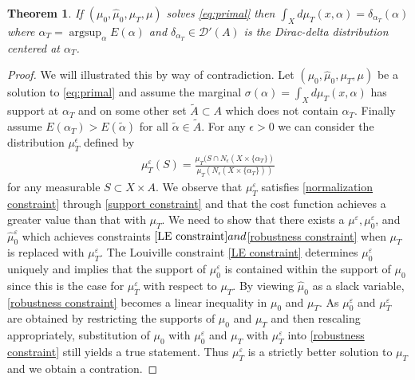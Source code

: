 \documentclass[12pt]{amsart}
\newtheorem{thm}{Theorem}[section]
\begin{document}
\begin{thm} \label{thm:Dirac}
If $(\mu_0,\hat{\mu}_0,\mu_T,\mu)$ solves \eqref{eq:primal} then $\int_X d\mu_T(x,\alpha) = \delta_{\alpha_T}(\alpha)$  where $\alpha_T = \operatorname{argsup}_\alpha E(\alpha)$ and $\delta_{\alpha_T} \in \mathcal{D}'(A)$ is the Dirac-delta distribution centered at $\alpha_T$.
\end{thm}
\begin{proof}
	We will illustrated this by way of contradiction.
	Let $(\mu_0,\hat{\mu}_0,\mu_T,\mu)$ be a solution to \eqref{eq:primal}
	and assume the marginal $\sigma (\alpha) = \int_X d\mu_T(x,\alpha)$ has support at  $\alpha_T $ and on some other set $\tilde{A} \subset A$ which does not contain $\alpha_T$.
	Finally assume $E(\alpha_T) > E( \tilde{\alpha} )$ for all $\tilde{\alpha} \in \tilde{A}$.
	For any $\epsilon > 0$ we can consider the distribution $\mu_T^\epsilon$ defined by
	\begin{align*}
		\mu^\varepsilon_T (S) = \frac{\mu_T( S \cap N_\epsilon(X \times \{ \alpha_T\} ) }{ \mu_T( N_\epsilon( X \times \{ \alpha_T\} ) ) }
	\end{align*}
	for any measurable $S \subset X \times A$.
	We observe that $\mu_T^\varepsilon$ satisfies \eqref{normalization constraint} through \eqref{support constraint}
	and that the cost function achieves a greater value than that with $\mu_T$.
	We need to show that there exists a $\mu^\varepsilon,\mu_0^\varepsilon$, and $\hat{\mu}_0^\varepsilon$
	which achieves constraints $\eqref{LE constraint} and $\eqref{robustness constraint} when $\mu_T$ is replaced with $\mu_T^\varepsilon$.
	The Louiville constraint \eqref{LE constraint} determines $\mu_0^\varepsilon$ uniquely and implies that the support of $\mu_0^\varepsilon$ is contained within the support of $\mu_0$
	since this is the case for $\mu_T^\varepsilon$ with respect to $\mu_T$.
	By viewing $\hat{\mu}_0$ as a slack variable, \eqref{robustness constraint} becomes a linear inequality in $\mu_0$ and $\mu_T$.
	As $\mu_0^\varepsilon$ and $\mu_T^\varepsilon$ are obtained by restricting the supports of $\mu_0$ and $\mu_T$ and then rescaling appropriately, substitution of $\mu_0$ with $\mu_0^\varepsilon$ and $\mu_T$ with $\mu_T^\varepsilon$
	into \eqref{robustness constraint} still yields a true statement.  Thus $\mu_T^\varepsilon$ is a strictly better solution to $\mu_T$ and we obtain a contration.
\end{proof}
\end{document}
